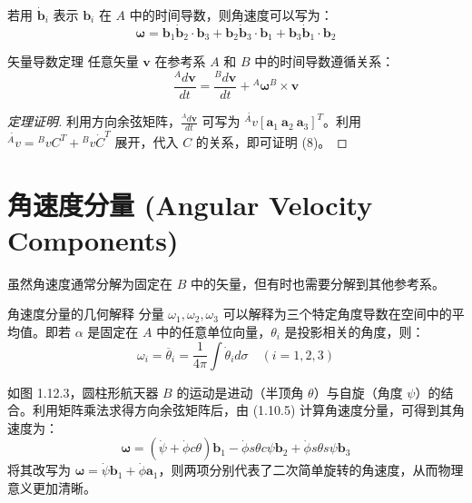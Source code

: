 若用 \(\dot{\mathbf{b}}_i\) 表示 \(\mathbf{b}_i\) 在 \(A\) 中的时间导数，则角速度可以写为：
\begin{equation}
\boldsymbol{\omega} = \mathbf{b}_1 \dot{\mathbf{b}}_2 \cdot \mathbf{b}_3 + \mathbf{b}_2 \dot{\mathbf{b}}_3 \cdot \mathbf{b}_1 + \mathbf{b}_3 \dot{\mathbf{b}}_1 \cdot \mathbf{b}_2 \tag{4}
\end{equation}

\begin{myTheorem}{矢量导数定理}
任意矢量 \(\mathbf{v}\) 在参考系 \(A\) 和 \(B\) 中的时间导数遵循关系：
\begin{equation}
\frac{{}^A d\mathbf{v}}{dt} = \frac{{}^B d\mathbf{v}}{dt} + {}^A \boldsymbol{\omega}^B \times \mathbf{v} \tag{8}
\end{equation}
\end{myTheorem}

\begin{proof}[定理证明]
利用方向余弦矩阵，\(\frac{{}^A d\mathbf{v}}{dt}\) 可写为 \(\dot{^A v} [\mathbf{a}_1\ \mathbf{a}_2\ \mathbf{a}_3]^T\)。利用 \(\dot{^A v} = {^B v} C^T + {^B v} \dot{C}^T\) 展开，代入 \(C\) 的关系，即可证明 (8)。
\end{proof}

\section{角速度分量 (Angular Velocity Components)}

虽然角速度通常分解为固定在 \(B\) 中的矢量，但有时也需要分解到其他参考系。
\begin{myTheorem}{角速度分量的几何解释}
分量 \(\omega_1, \omega_2, \omega_3\) 可以解释为三个特定角度导数在空间中的平均值。即若 \(\alpha\) 是固定在 \(A\) 中的任意单位向量，\(\theta_i\) 是投影相关的角度，则：
\begin{equation}
\omega_i = \overline{\theta}_i = \frac{1}{4\pi} \int \dot{\theta}_i d\sigma \quad (i=1,2,3) \tag{2}
\end{equation}
\end{myTheorem}

\begin{example}[进动与自旋的角速度]
如图 1.12.3，圆柱形航天器 \(B\) 的运动是进动（半顶角 \(\theta\)）与自旋（角度 \(\psi\)）的结合。利用矩阵乘法求得方向余弦矩阵后，由 (1.10.5) 计算角速度分量，可得到其角速度为：
\begin{equation}
\boldsymbol{\omega} = (\dot{\psi} + \dot{\phi} c\theta)\mathbf{b}_1 - \dot{\phi} s\theta c\psi \mathbf{b}_2 + \dot{\phi} s\theta s\psi \mathbf{b}_3 \tag{20}
\end{equation}
将其改写为 \(\boldsymbol{\omega} = \dot{\psi} \mathbf{b}_1 + \dot{\phi} \mathbf{a}_1\)，则两项分别代表了二次简单旋转的角速度，从而物理意义更加清晰。
\end{example}

